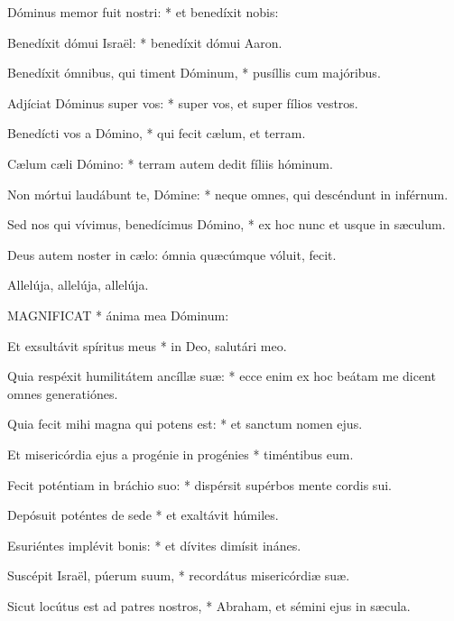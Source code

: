 Dóminus memor fuit nostri: * et benedíxit nobis:

Benedíxit dómui Israël: * benedíxit dómui Aaron.

Benedíxit ómnibus, qui timent Dóminum, * pusíllis cum majóribus.

Adjíciat Dóminus super vos: * super vos, et super fílios vestros.

Benedícti vos a Dómino, * qui fecit cælum, et terram.

Cælum cæli Dómino: * terram autem dedit fíliis hóminum.

Non mórtui laudábunt te, Dómine: * neque omnes, qui descéndunt in inférnum.

Sed nos qui vívimus, benedícimus Dómino, * ex hoc nunc et usque in sæculum.


 Deus autem noster in cælo: ómnia quæcúmque vóluit, fecit.


 Allelúja, allelúja, allelúja.



\lettrine[lines=2]{M}{AGNIFICAT} * ánima mea Dóminum:

Et exsultávit spíritus meus * in Deo, salutári meo.

Quia respéxit humilitátem ancíllæ suæ: * ecce enim ex hoc beátam me dicent omnes generatiónes.

Quia fecit mihi magna qui potens est: * et sanctum nomen ejus.

Et misericórdia ejus a progénie in progénies * timéntibus eum.

Fecit poténtiam in bráchio suo: * dispérsit supérbos mente cordis sui.

Depósuit poténtes de sede * et exaltávit húmiles.

Esuriéntes implévit bonis: * et dívites dimísit inánes.

Suscépit Israël, púerum suum, * recordátus misericórdiæ suæ.

Sicut locútus est ad patres nostros, * Abraham, et sémini ejus in sæcula.



